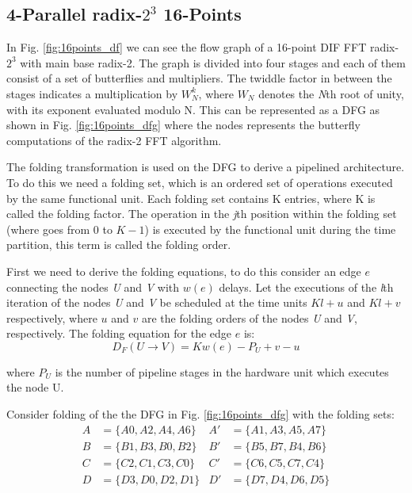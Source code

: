 \documentclass[journal,comsoc]{IEEEtran}
\begin{document}
\subsection{4-Parallel radix-$2^3$ 16-Points}
In Fig. \ref{fig:16points_df} we can see the flow graph of a 16-point DIF FFT radix-$2^3$ with main base radix-2. The graph is divided into four stages and each of them consist of a set of butterflies and multipliers. The twiddle factor in between the stages indicates a multiplication by $W^k_N$, where $W_N$ denotes the \textit{N}th root of unity, with its exponent evaluated modulo N. This can be represented as a DFG as shown in Fig. \ref{fig:16points_dfg} where the nodes represents the butterfly computations of the radix-2 FFT algorithm. 

The folding transformation is used on the DFG to derive a pipelined architecture. To do this we need a folding set, which is an ordered set of operations executed by the same functional unit. Each folding set contains K entries, where K is called the folding factor. The operation in the \textit{j}th position within the folding set (where goes from $0$ to $K-1$) is executed by the functional unit during the time partition, this term is called the folding order.

First we need to derive the folding equations, to do this consider an edge $e$ connecting the nodes \textit{U} and \textit{V} with $w(e)$ delays. Let the executions of the \textit{l}th iteration of the nodes \textit{U} and \textit{V} be scheduled at the time units $Kl+u$ and $Kl+v$ respectively, where $u$ and $v$ are the folding orders of the nodes \textit{U} and \textit{V}, respectively. The folding equation for the edge $e$ is:
\begin{equation}\label{eqn:fold_equation}
D_F(U \to V) = Kw(e)-P_U+v-u
\end{equation}

where $P_U$ is the number of pipeline stages in the hardware unit which executes the node U.

Consider folding of the the DFG in Fig. \ref{fig:16points_dfg} with the folding sets:
\begin{align} \label{eq:foldingset_16}
A&= \{ A0,A2,A4,A6 \}  & A'&= \{ A1,A3,A5,A7 \} \nonumber \\
B&=\{ B1,B3,B0,B2 \}   &B'&=\{ B5,B7,B4,B6 \} 	\nonumber \\
C&=\{ C2,C1,C3,C0 \}   &C'&=\{ C6,C5,C7,C4 \} 	\nonumber \\ 
D&=\{ D3,D0,D2,D1 \}   &D'&=\{ D7,D4,D6,D5 \}  
\end{align}
\end{document}
